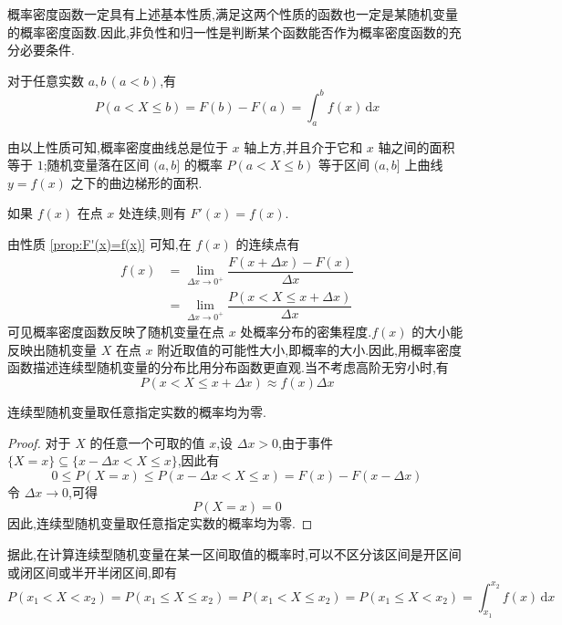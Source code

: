 概率密度函数一定具有上述基本性质,满足这两个性质的函数也一定是某随机变量的概率密度函数.因此,非负性和归一性是判断某个函数能否作为概率密度函数的充分必要条件.

\begin{property}
    \indent 对于任意实数 $a,b\,(a<b)$,有
    $$
    P(a < X \leqslant b) = F(b)-F(a) = \int_a^b f(x)\,\text{d}x
    $$
\end{property}

由以上性质可知,概率密度曲线总是位于 $x$ 轴上方,并且介于它和 $x$ 轴之间的面积等于 $1$;随机变量落在区间 $(a,b]$ 的概率 $P(a < X \leqslant b)$ 等于区间 $(a,b]$ 上曲线 $y=f(x)$ 之下的曲边梯形的面积.

\begin{property}[][][prop:F'(x)=f(x)]
    \indent 如果 $f(x)$ 在点 $x$ 处连续,则有 $F'(x)=f(x)$.
\end{property}

由性质 \ref{prop:F'(x)=f(x)} 可知,在 $f(x)$ 的连续点有
$$
\begin{aligned}
    f(x) &= \lim_{\Delta x \to 0^+} \dfrac{F(x + \Delta x)-F(x)}{\Delta x}\\
    &= \lim_{\Delta x \to 0^+} \dfrac{P(x < X \leqslant x + \Delta x)}{\Delta x}
\end{aligned}
$$
可见概率密度函数反映了随机变量在点 $x$ 处概率分布的密集程度.$f(x)$ 的大小能反映出随机变量 $X$ 在点 $x$ 附近取值的可能性大小,即概率的大小.因此,用概率密度函数描述连续型随机变量的分布比用分布函数更直观.当不考虑高阶无穷小时,有
$$
P(x < X \leqslant x + \Delta x) \approx f(x) \Delta x
$$

\begin{conclusion}
    \indent 连续型随机变量取任意指定实数的概率均为零.
\end{conclusion}

\begin{proof}
    对于 $X$ 的任意一个可取的值 $x$,设 $\Delta x > 0$,由于事件 $\{X=x\} \subseteq \{x - \Delta x < X \leqslant x\}$,因此有
    $$
    0 \leqslant P(X=x) \leqslant P(x - \Delta x < X \leqslant x) = F(x)-F(x-\Delta x)
    $$
    令 $\Delta x \to 0$,可得
    $$
    P(X=x)=0
    $$
    因此,连续型随机变量取任意指定实数的概率均为零.
\end{proof}

据此,在计算连续型随机变量在某一区间取值的概率时,可以不区分该区间是开区间或闭区间或半开半闭区间,即有
$$
P(x_1 < X < x_2) = P(x_1 \leqslant X \leqslant x_2) = P(x_1 < X \leqslant x_2) = P(x_1 \leqslant X < x_2) = \int_{x_1}^{x_2} f(x)\,\text{d}x
$$

